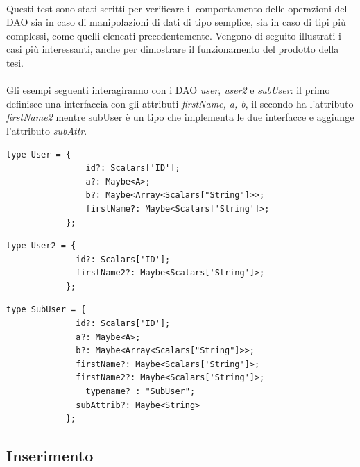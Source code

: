 \documentclass[a4paper, 12pt]{report}
\begin{document}
        \paragraph*{}
          Questi test sono stati scritti per verificare il comportamento delle operazioni del DAO sia in caso di manipolazioni di dati di tipo semplice, sia in caso di tipi più complessi, come quelli elencati precedentemente.
          Vengono di seguito illustrati i casi più interessanti, anche per dimostrare il funzionamento del prodotto della tesi.
          \paragraph*{}
          Gli esempi seguenti interagiranno con i DAO \emph{user}, \emph{user2} e \emph{subUser}: il primo definisce una interfaccia con gli attributi \emph{firstName, a, b}, il secondo ha l'attributo \emph{firstName2} mentre subUser è un tipo che implementa le due interfacce e aggiunge l'attributo \emph{subAttr}.
          \begin{Verbatim}[samepage=true]
            type User = {
                id?: Scalars['ID'];
                a?: Maybe<A>;
                b?: Maybe<Array<Scalars["String"]>>;
                firstName?: Maybe<Scalars['String']>;
            };
          \end{Verbatim}
          \begin{Verbatim}[samepage=true]
            type User2 = {
              id?: Scalars['ID'];
              firstName2?: Maybe<Scalars['String']>;
            };
          \end{Verbatim}
          \begin{Verbatim}[samepage=true]
            type SubUser = {
              id?: Scalars['ID'];
              a?: Maybe<A>;
              b?: Maybe<Array<Scalars["String"]>>;
              firstName?: Maybe<Scalars['String']>;
              firstName2?: Maybe<Scalars['String']>;
              __typename? : "SubUser";
              subAttrib?: Maybe<String>
            };

          \end{Verbatim}
        \subsection{Inserimento}
\end{document}
